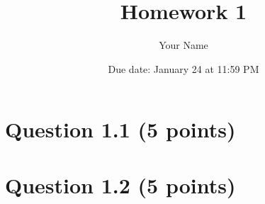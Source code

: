 \documentclass{article}
\title{Homework 1}
\author{Your Name}
\date{Due date: January 24 at 11:59 PM}
\begin{document}
\maketitle

\section*{Question 1.1 (5 points)}

\section*{Question 1.2 (5 points)}
\end{document}
